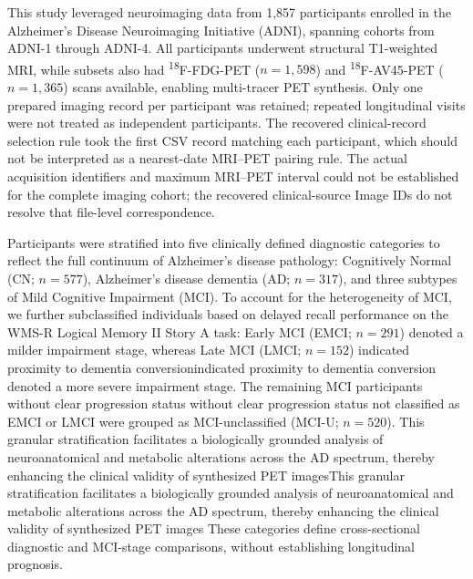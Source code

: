 \documentclass{article}
\providecommand{\DIFaddtex}[1]{{\protect\color{blue} \sf #1}} %
\providecommand{\DIFdeltex}[1]{{\protect\color{red} \ifmmode #1\else\scriptsize #1\fi}} %
\providecommand{\DIFaddbegin}{} %
\providecommand{\DIFaddend}{} %
\providecommand{\DIFdelbegin}{} %
\providecommand{\DIFdelend}{} %
\providecommand{\DIFadd}[1]{\texorpdfstring{\DIFaddtex{#1}}{#1}} %
\providecommand{\DIFdel}[1]{\texorpdfstring{\DIFdeltex{#1}}{}} %
\newcommand{\DIFscaledelfig}{0.5}
\newlength{\DIFdelgraphicswidth} %
\newlength{\DIFdelgraphicsheight} %
\newcommand{\DIFaddincludegraphics}[2][]{{\color{blue}\fbox{\DIFOincludegraphics[#1]{#2}}}} %
\newcommand{\DIFdelincludegraphics}[2][]{%
\sbox{\DIFdelgraphicsbox}{\DIFOincludegraphics[#1]{#2}}%
\settoboxwidth{\DIFdelgraphicswidth}{\DIFdelgraphicsbox} %
\settoboxtotalheight{\DIFdelgraphicsheight}{\DIFdelgraphicsbox} %
\scalebox{\DIFscaledelfig}{%
\parbox[b]{\DIFdelgraphicswidth}{\usebox{\DIFdelgraphicsbox}\\[-\baselineskip] \rule{\DIFdelgraphicswidth}{0em}}\llap{\resizebox{\DIFdelgraphicswidth}{\DIFdelgraphicsheight}{%
\setlength{\unitlength}{\DIFdelgraphicswidth}%
\begin{picture}(1,1)%
\thicklines\linethickness{2pt} %
{\color[rgb]{1,0,0}\put(0,0){\framebox(1,1){}}}%
{\color[rgb]{1,0,0}\put(0,0){\line( 1,1){1}}}%
{\color[rgb]{1,0,0}\put(0,1){\line(1,-1){1}}}%
\end{picture}%
}\hspace*{3pt}}} %
} %
\DeclareRobustCommand{\DIFaddbegin}{\DIFOaddbegin \let\includegraphics\DIFaddincludegraphics} %
\DeclareRobustCommand{\DIFaddend}{\DIFOaddend \let\includegraphics\DIFOincludegraphics} %
\DeclareRobustCommand{\DIFdelbegin}{\DIFOdelbegin \let\includegraphics\DIFdelincludegraphics} %
\DeclareRobustCommand{\DIFdelend}{\DIFOaddend \let\includegraphics\DIFOincludegraphics} %
\begin{document}
This study leveraged neuroimaging data from 1,857 participants enrolled in the Alzheimer’s Disease Neuroimaging Initiative (ADNI), spanning cohorts from ADNI-1 through ADNI-4. All participants underwent structural T1-weighted MRI, while subsets also had \textsuperscript{18}F-FDG-PET ($n = 1,598$) and \textsuperscript{18}F-AV45-PET ($n = 1,365$) scans available, enabling multi-tracer PET synthesis. \DIFaddbegin \DIFadd{Only one prepared imaging record per participant was retained; repeated longitudinal visits were not treated as independent participants. The recovered clinical-record selection rule took the first CSV record matching each participant, which should not be interpreted as a nearest-date MRI--PET pairing rule. The actual acquisition identifiers and maximum MRI--PET interval could not be established for the complete imaging cohort; the recovered clinical-source Image IDs do not resolve that file-level correspondence.
}\DIFaddend 

Participants were stratified into five clinically defined diagnostic categories to reflect the full continuum of Alzheimer’s disease pathology: Cognitively Normal (CN; $n = 577$), Alzheimer’s disease dementia (AD; $n = 317$), and three subtypes of Mild Cognitive Impairment (MCI). To account for the heterogeneity of MCI, we further subclassified individuals based on delayed recall performance on the WMS-R Logical Memory II Story A task: Early MCI (EMCI; $n = 291$) denoted a milder impairment stage, whereas Late MCI (LMCI; $n = 152$) \DIFdelbegin \DIFdel{indicated proximity to dementia conversion}\DIFdelend \DIFaddbegin \DIFadd{denoted a more severe impairment stage}\DIFaddend . The remaining MCI participants \DIFdelbegin \DIFdel{without clear progression status }\DIFdelend \DIFaddbegin \DIFadd{not classified as EMCI or LMCI }\DIFaddend were grouped as MCI-unclassified (MCI-U; $n = 520$). \DIFdelbegin \DIFdel{This granular stratification facilitates a biologically grounded analysis of neuroanatomical and metabolic alterations across the AD spectrum, thereby enhancing the clinical validity of synthesized PET images}\DIFdelend \DIFaddbegin \DIFadd{These categories define cross-sectional diagnostic and MCI-stage comparisons, without establishing longitudinal prognosis}\DIFaddend .
\end{document}
